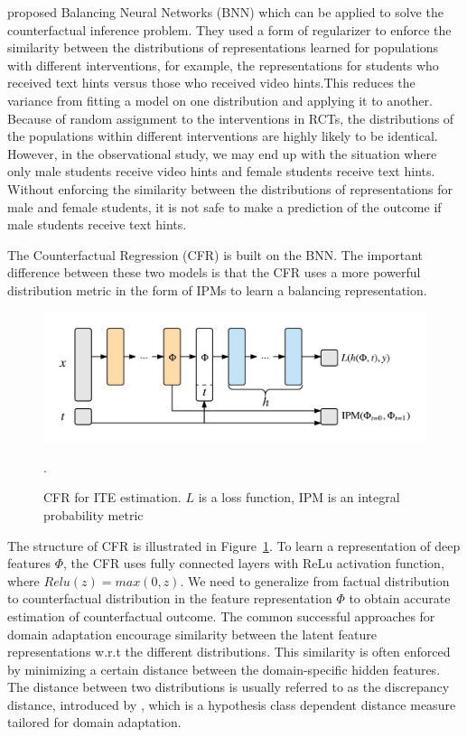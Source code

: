 \documentclass{article}
\begin{document}
\cite{Johansson2016-dh} proposed Balancing Neural Networks (BNN) which
can be applied to solve the counterfactual inference problem. They
used a form of regularizer to enforce the similarity between the
distributions of representations learned for populations with
different interventions, for example, the representations for students
who received text hints versus those who received video hints.This
reduces the variance from fitting a model on one distribution and
applying it to another. Because of random assignment to the
interventions in RCTs, the distributions of the populations within
different interventions are highly likely to be identical. However, in
the observational study, we may end up with the situation where only
male students receive video hints and female students receive text
hints. Without enforcing the similarity between the distributions of
representations for male and female students, it is not safe to make a
prediction of the outcome if male students receive text hints.

The Counterfactual Regression (CFR) \cite{Shalit2016-qk} is built on the BNN. The important difference between these two models is that the CFR uses a more powerful distribution metric in the form of IPMs to learn a balancing representation.

\begin{figure}[h]
  \centering
  \includegraphics[width=0.95\columnwidth]{cfr.png}
  \caption{CFR for ITE estimation. $L$ is a loss function, IPM is an integral probability metric}.
  ~\label{fg:cfr-model}
\end{figure}

The structure of CFR is illustrated in Figure~\ref{fg:cfr-model}. To learn a representation of deep features $\Phi$, the CFR uses fully connected layers with ReLu activation function, where $Relu(z) = max(0, z)$. We need to generalize from factual distribution to counterfactual distribution in the feature representation $\Phi$ to obtain accurate estimation of counterfactual outcome. The common successful approaches for domain adaptation encourage similarity between the latent feature representations w.r.t the different distributions. This similarity is often enforced by minimizing a certain distance between the domain-specific hidden features. The distance between two distributions is usually referred to as the discrepancy distance, introduced by \cite{Mansour2009-fh}, which is a hypothesis class dependent distance measure tailored for domain adaptation. 
\end{document}
